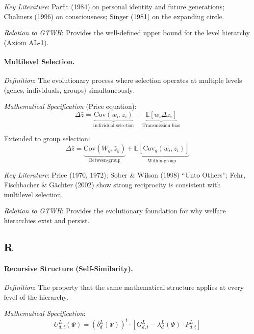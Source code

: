\documentclass[12pt,a4paper]{article}
\begin{document}
\textit{Key Literature}: Parfit (1984) on personal identity and future generations; 
Chalmers (1996) on consciousness; Singer (1981) on the expanding circle.

\textit{Relation to GTWH}: Provides the well-defined upper bound for the 
level hierarchy (Axiom AL-1).

\medskip

\paragraph{Multilevel Selection.}
\textit{Definition}: The evolutionary process where selection operates at 
multiple levels (genes, individuals, groups) simultaneously.

\textit{Mathematical Specification} (Price equation):
\begin{equation}
\Delta \bar{z} = \underbrace{\text{Cov}(w_i, z_i)}_{\text{Individual selection}} + 
\underbrace{\mathbb{E}[w_i \Delta z_i]}_{\text{Transmission bias}}
\end{equation}

Extended to group selection:
\begin{equation}
\Delta \bar{z} = \underbrace{\text{Cov}(W_g, \bar{z}_g)}_{\text{Between-group}} + 
\underbrace{\mathbb{E}[\text{Cov}_g(w_i, z_i)]}_{\text{Within-group}}
\end{equation}

\textit{Key Literature}: Price (1970, 1972); Sober \& Wilson (1998) ``Unto Others''; 
Fehr, Fischbacher \& Gächter (2002) show strong reciprocity is consistent with 
multilevel selection.

\textit{Relation to GTWH}: Provides the evolutionary foundation for why 
welfare hierarchies exist and persist.

\subsection*{R}

\paragraph{Recursive Structure (Self-Similarity).}
\textit{Definition}: The property that the same mathematical structure applies 
at every level of the hierarchy.

\textit{Mathematical Specification}:
\begin{equation}
U^L_{d,t}(\Psi) = \left(\delta^L_d(\Psi)\right)^t \cdot \left[G^L_{d,t} - \lambda^L_d(\Psi) \cdot P^L_{d,t}\right]
\end{equation}
\end{document}
